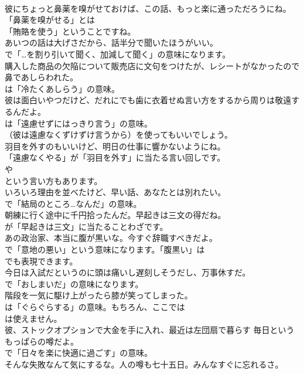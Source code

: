 \documentclass[8pt]{extreport}
\begin{document}
\begin{CJK}{UTF8}{min}
\\	彼にちょっと鼻薬を嗅がせておけば、この話、もっと楽に通っただろうにね。 
\\	「鼻薬を嗅がせる」とは
\\	「賄賂を使う」ということですね。	
\\	あいつの話は大げさだから、話半分で聞いたほうがいい。 
\\	で「…を割り引いて聞く、加減して聞く」の意味になります。	
\\	購入した商品の欠陥について販売店に文句をつけたが、レシートがなかったので鼻であしらわれた。 
\\	は「冷たくあしらう」の意味。	
\\	彼は面白いやつだけど、だれにでも歯に衣着せぬ言い方をするから周りは敬遠するんだよ。 
\\	は「遠慮せずにはっきり言う」の意味。
\\	（彼は遠慮なくずけずけ言うから）を使ってもいいでしょう。	
\\	羽目を外すのもいいけど、明日の仕事に響かないようにね。 
\\	「遠慮なくやる」が「羽目を外す」に当たる言い回しです。
\\	や
\\	という言い方もあります。	
\\	いろいろ理由を並べたけど、早い話、あなたとは別れたい。 
\\	で「結局のところ…なんだ」の意味。	
\\	朝練に行く途中に千円拾ったんだ。早起きは三文の得だね。 
\\	が「早起きは三文」に当たることわざです。	
\\	あの政治家、本当に腹が黒いな。今すぐ辞職すべきだよ。 
\\	で「意地の悪い」という意味になります。「腹黒い」は 
\\	でも表現できます。	
\\	今日は入試だというのに頭は痛いし遅刻しそうだし、万事休すだ。 
\\	で「おしまいだ」の意味になります。	
\\	階段を一気に駆け上がったら膝が笑ってしまった。 
\\	は「ぐらぐらする」の意味。もちろん、ここでは 
\\	は使えません。	
\\	彼、ストックオプションで大金を手に入れ、最近は左団扇で暮らす 毎日というもっぱらの噂だよ。 
\\	で「日々を楽に快適に過ごす」の意味。	
\\	そんな失敗なんて気にするな。人の噂も七十五日。みんなすぐに忘れるさ。 

\end{CJK}
\end{document}
